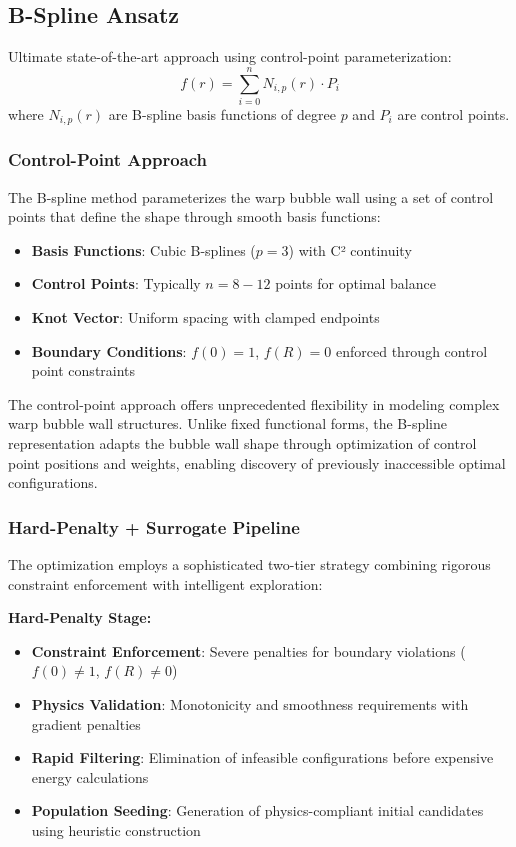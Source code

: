 \documentclass[12pt]{article}
\begin{document}
\subsection{B-Spline Ansatz}
Ultimate state-of-the-art approach using control-point parameterization:
\[
  f(r) = \sum_{i=0}^{n} N_{i,p}(r) \cdot P_i
\]
where $N_{i,p}(r)$ are B-spline basis functions of degree $p$ and $P_i$ are control points.

\subsubsection{Control-Point Approach}
The B-spline method parameterizes the warp bubble wall using a set of control points that define the shape through smooth basis functions:

\begin{itemize}
\item \textbf{Basis Functions}: Cubic B-splines ($p=3$) with C² continuity
\item \textbf{Control Points}: Typically $n=8-12$ points for optimal balance
\item \textbf{Knot Vector}: Uniform spacing with clamped endpoints
\item \textbf{Boundary Conditions}: $f(0)=1$, $f(R)=0$ enforced through control point constraints
\end{itemize}

The control-point approach offers unprecedented flexibility in modeling complex warp bubble wall structures. Unlike fixed functional forms, the B-spline representation adapts the bubble wall shape through optimization of control point positions and weights, enabling discovery of previously inaccessible optimal configurations.

\subsubsection{Hard-Penalty + Surrogate Pipeline}
The optimization employs a sophisticated two-tier strategy combining rigorous constraint enforcement with intelligent exploration:

\textbf{Hard-Penalty Stage:}
\begin{itemize}
\item \textbf{Constraint Enforcement}: Severe penalties for boundary violations ($f(0) \neq 1$, $f(R) \neq 0$)
\item \textbf{Physics Validation}: Monotonicity and smoothness requirements with gradient penalties
\item \textbf{Rapid Filtering}: Elimination of infeasible configurations before expensive energy calculations
\item \textbf{Population Seeding}: Generation of physics-compliant initial candidates using heuristic construction
\end{itemize}
\end{document}
